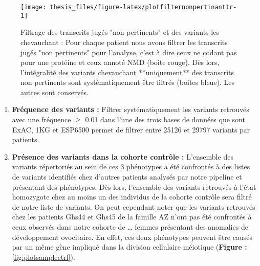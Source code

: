 \documentclass[12pt,twoside]{reedthesis}
\theoremstyle{definition}
\theoremstyle{definition}
\theoremstyle{remark}
\begin{document}
  \newpage 
  
  \begin{figure}
  
  {\centering \texttt{[image: thesis\_files/figure-latex/plotfilternonpertinanttr-1]} 
  
  }
  
  \caption[Filtrage des transcrits jugés "non pertinents" et des variants les chevauchant]{Filtrage des transcrits jugés "non pertinents" et des variants les chevauchant : Pour chaque patient nous avons filtrer les transcrits jugés "non pertinents" pour l'analyse, c'est à dire ceux ne codant pas pour une protéine et ceux annoté NMD (boite rouge). Dès lors, l'intégralité des variants chevauchant **uniquement** des transcrits non pertinents sont systématiquement être filtrés (boites bleue). Les autres sont conservés.}\label{fig:plotfilternonpertinanttr}
  \end{figure}
  
  \begin{enumerate}
  \def\labelenumi{\arabic{enumi}.}
  \setcounter{enumi}{4}
  \item
    \textbf{Fréquence des variants :} Filtrer systématiquement les
    variants retrouvés avec une fréquence \(\ge\) 0.01 dans l'une des
    trois bases de données que sont ExAC, 1KG et ESP6500 permet de filtrer
    entre 25126 et 29797 variants par patients.
  \item
    \textbf{Présence des variants dans la cohorte contrôle :} L'ensemble
    des variants répertoriés au sein de ces 3 phénotypes a été confrontés
    à des listes de variants identifiés chez d'autres patients analysés
    par notre pipeline et présentant des phénotypes. Dès lors, l'ensemble
    des variants retrouvés à l'état homozygote chez au moins un des
    individus de la cohorte contrôle sera filtré de notre liste de
    variants. On peut cependant noter que les variants retrouvés chez les
    patients Ghs44 et Ghs45 de la famille AZ n'ont pas été confrontés à
    ceux observés dans notre cohorte de \ldots{} femmes présentant des
    anomalies de développement ovocitaire. En effet, ces deux phénotypes
    peuvent être causés par un même gène impliqué dans la division
    cellulaire méiotique (\textbf{Figure :} \ref{fig:plotsamplectrl}).
  \end{enumerate}
  
  \newpage
  
\end{document}

